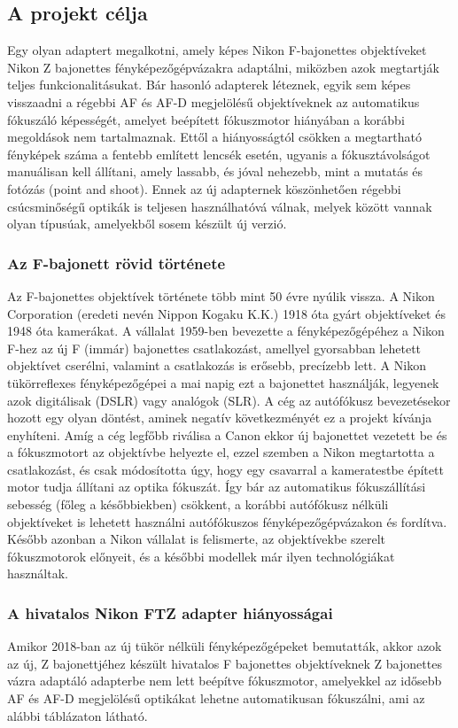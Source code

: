 \subsection{A projekt célja}
Egy olyan adaptert megalkotni, amely képes Nikon F-bajonettes objektíveket Nikon Z bajonettes fényképezőgépvázakra adaptálni, miközben azok megtartják teljes funkcionalitásukat. Bár hasonló adapterek léteznek, egyik sem képes visszaadni a régebbi AF és AF-D megjelölésű objektíveknek az automatikus fókuszáló képességét, amelyet beépített fókuszmotor hiányában a korábbi megoldások nem tartalmaznak. Ettől a hiányosságtól csökken a megtartható fényképek száma a fentebb említett lencsék esetén, ugyanis a fókusztávolságot manuálisan kell állítani, amely lassabb, és jóval nehezebb, mint a mutatás és fotózás (point and shoot). Ennek az új adapternek köszönhetően régebbi csúcsminőségű optikák is teljesen használhatóvá válnak, melyek között vannak olyan típusúak, amelyekből sosem készült új verzió.
\subsubsection{Az F-bajonett rövid története}
Az F-bajonettes objektívek története több mint 50 évre nyúlik vissza. A Nikon Corporation (eredeti nevén Nippon Kogaku K.K.) 1918 óta gyárt objektíveket és 1948 óta kamerákat. A vállalat 1959-ben bevezette a fényképezőgépéhez a Nikon F-hez az új F (immár) bajonettes csatlakozást\cite{Nikon_tori}, amellyel gyorsabban lehetett objektívet cserélni, valamint a csatlakozás is erősebb, precízebb lett. A Nikon tükörreflexes fényképezőgépei a mai napig ezt a bajonettet használják, legyenek azok digitálisak (DSLR) vagy analógok (SLR). A cég az autófókusz bevezetésekor hozott egy olyan döntést, aminek negatív következményét ez a projekt kívánja enyhíteni. Amíg a cég legfőbb riválisa a Canon ekkor új bajonettet vezetett be és a fókuszmotort az objektívbe helyezte el, ezzel szemben a Nikon megtartotta a csatlakozást, és csak módosította úgy, hogy egy csavarral a kameratestbe épített motor tudja állítani az optika fókuszát. Így bár az automatikus fókuszállítási sebesség (főleg a későbbiekben) csökkent, a korábbi autófókusz nélküli objektíveket is lehetett használni autófókuszos fényképezőgépvázakon és fordítva. Később azonban a Nikon vállalat is felismerte, az objektívekbe szerelt fókuszmotorok előnyeit, és a későbbi modellek már ilyen technológiákat használtak.
\subsubsection{A hivatalos Nikon FTZ adapter hiányosságai}
Amikor 2018-ban az új tükör nélküli fényképezőgépeket bemutatták\cite{Nikon_Z_Release}, akkor azok az új, Z bajonettjéhez készült hivatalos F bajonettes objektíveknek Z bajonettes vázra adaptáló adapterbe nem lett beépítve fókuszmotor, amelyekkel az idősebb AF és AF-D megjelölésű optikákat lehetne automatikusan fókuszálni, ami az alábbi táblázaton látható.

